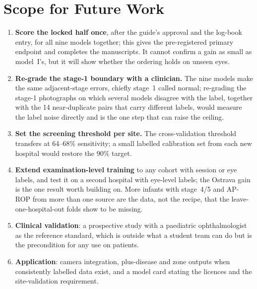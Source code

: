 \section{Scope for Future Work}
\begin{enumerate}
\item \textbf{Score the locked half once}, after the guide's approval and the log-book entry, for all nine models together; this gives the pre-registered primary endpoint and completes the manuscripts. It cannot confirm a gain as small as model~I's, but it will show whether the ordering holds on unseen eyes.
\item \textbf{Re-grade the stage-1 boundary with a clinician.} The nine models make the same adjacent-stage errors, chiefly stage~1 called normal; re-grading the stage-1 photographs on which several models disagree with the label, together with the 14 near-duplicate pairs that carry different labels, would measure the label noise directly and is the one step that can raise the ceiling.
\item \textbf{Set the screening threshold per site.} The cross-validation threshold transfers at 64--68\% sensitivity; a small labelled calibration set from each new hospital would restore the 90\% target.
\item \textbf{Extend examination-level training} to any cohort with session or eye labels, and test it on a second hospital with eye-level labels; the Ostrava gain is the one result worth building on. More infants with stage~4/5 and AP-ROP from more than one source are the data, not the recipe, that the leave-one-hospital-out folds show to be missing.
\item \textbf{Clinical validation}: a prospective study with a paediatric ophthalmologist as the reference standard, which is outside what a student team can do but is the precondition for any use on patients.
\item \textbf{Application}: camera integration, plus-disease and zone outputs when consistently labelled data exist, and a model card stating the licences and the site-validation requirement.
\end{enumerate}
